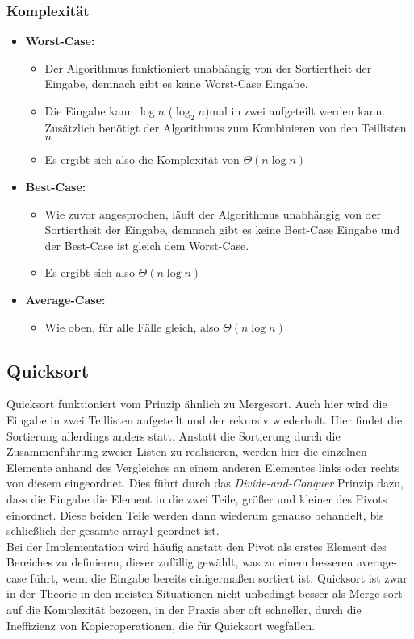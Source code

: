 \documentclass[
../../AuD-Zusammenfassung.tex,
]
{subfiles}
\begin{document}
\subsubsection{Komplexität}
\begin{itemize}
    \item \textbf{Worst-Case:}
    \begin{itemize}
        \item Der Algorithmus funktioniert unabhängig von der Sortiertheit der Eingabe, demnach gibt es keine Worst-Case Eingabe. 
        \item Die Eingabe kann $\log n$ ($\log_2 n$)mal in zwei aufgeteilt werden kann. Zusätzlich benötigt der Algorithmus zum Kombinieren von den Teillisten $n$
        \item Es ergibt sich also die Komplexität von $\Theta(n\log n)$
    \end{itemize}
    \item \textbf{Best-Case:}
    \begin{itemize}
        \item Wie zuvor angesprochen, läuft der Algorithmus unabhängig von der Sortiertheit der Eingabe, demnach gibt es keine Best-Case Eingabe und der Best-Case ist gleich dem Worst-Case.
        \item Es ergibt sich also $\Theta(n\log n)$
    \end{itemize}
    \item \textbf{Average-Case:}
    \begin{itemize}
        \item Wie oben, für alle Fälle gleich, also $\Theta(n\log n)$ 
    \end{itemize}
\end{itemize}
\newpage
\subsection{Quicksort}

Quicksort funktioniert vom Prinzip ähnlich zu Mergesort. Auch hier wird die Eingabe in zwei Teillisten aufgeteilt und der rekursiv wiederholt. Hier findet die Sortierung allerdings anders statt. Anstatt die Sortierung durch die Zusammenführung zweier Listen zu realisieren, werden hier die einzelnen Elemente anhand des Vergleiches an einem anderen Elementes links oder rechts von diesem eingeordnet. Dies führt durch das \textit{Divide-and-Conquer} Prinzip dazu, dass die Eingabe die Element in die zwei Teile, größer und kleiner des Pivots einordnet. Diese beiden Teile werden dann wiederum genauso behandelt, bis schließlich der gesamte array1 geordnet ist.\\
Bei der Implementation wird häufig anstatt den Pivot als erstes Element des Bereiches zu definieren, dieser zufällig gewählt, was zu einem besseren average-case führt, wenn die Eingabe bereits einigermaßen sortiert ist. 
Quicksort ist zwar in der Theorie in den meisten Situationen nicht unbedingt besser als Merge sort auf die Komplexität bezogen, in der Praxis aber oft schneller, durch die Ineffizienz von Kopieroperationen, die für Quicksort wegfallen.
\newpage
\end{document}
